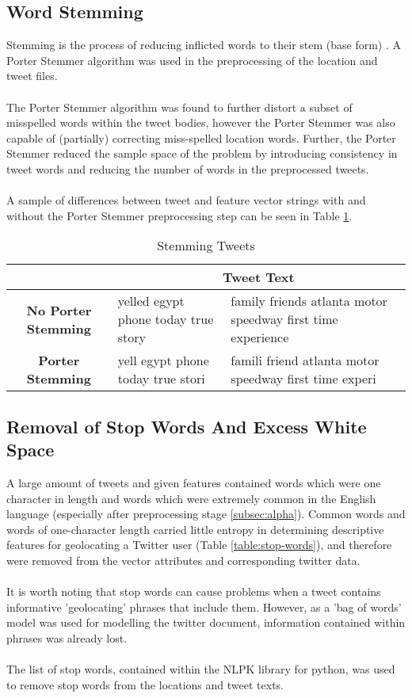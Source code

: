 \documentclass[11pt]{article}
\begin{document}
\subsection{Word Stemming}

Stemming is the process of reducing inflicted words to their stem (base form) \citep{pm-stem}. A Porter Stemmer algorithm was used in the preprocessing of the location and tweet files. \\\\
The Porter Stemmer algorithm was found to further distort a subset of misspelled words within the tweet bodies, however the Porter Stemmer was also capable of (partially) correcting miss-spelled location words. Further, the Porter Stemmer reduced the sample space of the problem by introducing consistency in tweet words and reducing the number of words in the preprocessed tweets.\\\\
A sample of differences between tweet and feature vector strings with and without the Porter Stemmer preprocessing step can be seen in Table \ref{table:stem-tweet}.
   
\begin{table} [ht]
\caption{Stemming Tweets}
\begin{center}
	\begin{tabular}{| c | p{6cm} | p{6cm} |}
	\hline
	  & \multicolumn{2}{|c|}{\textbf{Tweet Text}}\\
	\hline
	\textbf{No Porter Stemming} & yelled egypt phone today true story & family friends atlanta motor speedway first time experience\\
	\hline
	\textbf{Porter Stemming}  & yell egypt phone today true stori & famili friend atlanta motor speedway first time experi \\
	\hline
	\end{tabular}
\end{center}
\label{table:stem-tweet}
\end{table}

\subsection{Removal of Stop Words And Excess White Space}
A large amount of tweets and given features contained words which were one character in length and words which were extremely common in the English language (especially after preprocessing stage \ref{subsec:alpha}). Common words and words of one-character length carried little entropy\citep{ra-stop} in determining descriptive features for geolocating a Twitter user (Table \ref{table:stop-words}), and therefore were removed from the vector attributes and corresponding twitter data.\\\\
It is worth noting that stop words can cause problems when a tweet contains informative 'geolocating' phrases that include them. However, as a 'bag of words' model was used for modelling the twitter document, information contained within phrases was already lost. \\\\
The list of stop words, contained within the NLPK library for python, was used to remove stop words from the locations and tweet texts.
\end{document}
